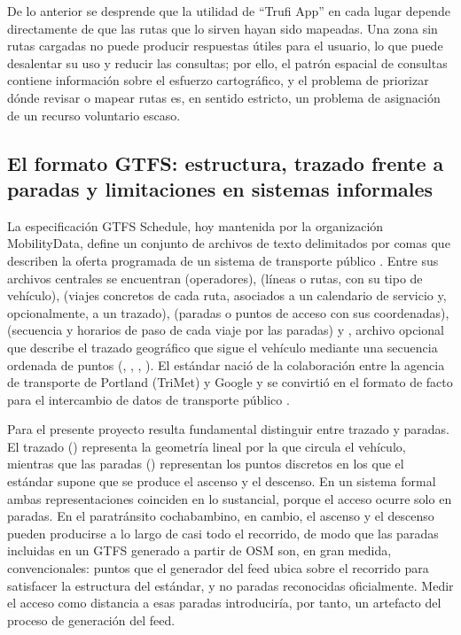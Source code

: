 De lo anterior se desprende que la utilidad de ``Trufi App'' en cada lugar depende directamente
de que las rutas que lo sirven hayan sido mapeadas. Una zona sin rutas cargadas no puede
producir respuestas útiles para el usuario, lo que puede desalentar su uso y reducir las
consultas; por ello, el patrón espacial de consultas contiene información sobre el esfuerzo
cartográfico, y el problema de priorizar dónde revisar o mapear rutas es, en sentido
estricto, un problema de asignación de un recurso voluntario escaso.

\subsection{El formato GTFS: estructura, trazado frente a paradas y limitaciones en sistemas informales}
\label{subsec:gtfs}

La especificación GTFS Schedule, hoy mantenida por la organización MobilityData, define un
conjunto de archivos de texto delimitados por comas que describen la oferta programada de
un sistema de transporte público \parencite{mobilitydata-gtfs}. Entre sus archivos centrales
se encuentran  (operadores),  (líneas o rutas, con su tipo
de vehículo),  (viajes concretos de cada ruta, asociados a un calendario de
servicio y, opcionalmente, a un trazado),  (paradas o puntos de acceso con sus
coordenadas),  (secuencia y horarios de paso de cada viaje por las
paradas) y , archivo opcional que describe el trazado geográfico que sigue el
vehículo mediante una secuencia ordenada de puntos (, ,
, ). El estándar nació de la colaboración entre la
agencia de transporte de Portland (TriMet) y Google y se convirtió en el formato de facto
para el intercambio de datos de transporte público \parencite{mchugh2013}.

Para el presente proyecto resulta fundamental distinguir entre trazado y paradas. El trazado
() representa la geometría lineal por la que circula el vehículo, mientras
que las paradas () representan los puntos discretos en los que el estándar
supone que se produce el ascenso y el descenso. En un sistema formal ambas representaciones
coinciden en lo sustancial, porque el acceso ocurre solo en paradas. En el paratránsito
cochabambino, en cambio, el ascenso y el descenso pueden producirse a lo largo de casi todo
el recorrido, de modo que las paradas incluidas en un GTFS generado a partir de OSM son, en
gran medida, convencionales: puntos que el generador del feed ubica sobre el recorrido para
satisfacer la estructura del estándar, y no paradas reconocidas oficialmente. Medir el
acceso como distancia a esas paradas introduciría, por tanto, un artefacto del proceso de
generación del feed.

